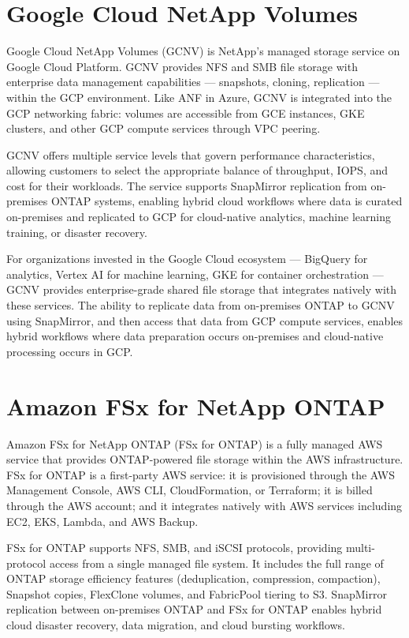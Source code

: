 \section{Google Cloud NetApp Volumes}

Google Cloud NetApp Volumes (GCNV) is NetApp's managed storage service on
Google Cloud Platform. GCNV provides NFS and SMB file storage with enterprise
data management capabilities --- snapshots, cloning, replication --- within
the GCP environment. Like ANF in Azure, GCNV is integrated into the GCP
networking fabric: volumes are accessible from GCE instances, GKE clusters,
and other GCP compute services through VPC peering.

GCNV offers multiple service levels that govern performance characteristics,
allowing customers to select the appropriate balance of throughput, IOPS, and
cost for their workloads. The service supports SnapMirror replication from
on-premises ONTAP systems, enabling hybrid cloud workflows where data is
curated on-premises and replicated to GCP for cloud-native analytics, machine
learning training, or disaster recovery.

For organizations invested in the Google Cloud ecosystem --- BigQuery for
analytics, Vertex AI for machine learning, GKE for container orchestration ---
GCNV provides enterprise-grade shared file storage that integrates natively
with these services. The ability to replicate data from on-premises ONTAP to
GCNV using SnapMirror, and then access that data from GCP compute services,
enables hybrid workflows where data preparation occurs on-premises and
cloud-native processing occurs in GCP.

\section{Amazon FSx for NetApp ONTAP}

Amazon FSx for NetApp ONTAP (FSx for ONTAP) is a fully managed AWS service
that provides ONTAP-powered file storage within the AWS infrastructure. FSx
for ONTAP is a first-party AWS service: it is provisioned through the AWS
Management Console, AWS CLI, CloudFormation, or Terraform; it is billed
through the AWS account; and it integrates natively with AWS services
including EC2, EKS, Lambda, and AWS Backup.

FSx for ONTAP supports NFS, SMB, and iSCSI protocols, providing multi-protocol
access from a single managed file system. It includes the full range of ONTAP
storage efficiency features (deduplication, compression, compaction), Snapshot
copies, FlexClone volumes, and FabricPool tiering to S3. SnapMirror
replication between on-premises ONTAP and FSx for ONTAP enables hybrid cloud
disaster recovery, data migration, and cloud bursting workflows.

